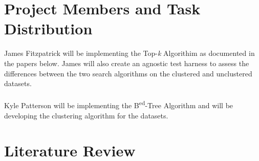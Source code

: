 \documentclass[pdftex,12pt,letter]{article}
\begin{document}
\section{Project Members and Task Distribution}
James Fitzpatrick will be implementing the Top-\textit{k}  Algorithim as documented in the papers below. James will also create an agnostic test harness to assess the differences between the two search algorithms on the clustered and unclustered datasets.
\\\\
Kyle Patterson will be implementing the B\textsuperscript{ed}-Tree Algorithm and will be developing the clustering algorithm for the datasets. 

\newpage
\section{Literature Review}
\end{document}
